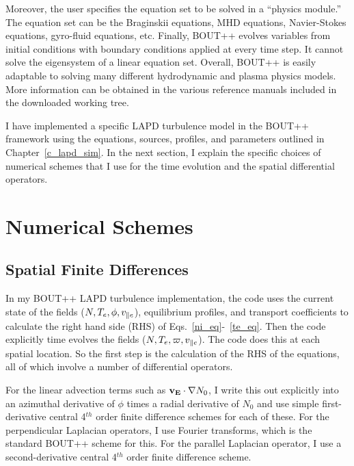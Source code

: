Moreover, the user specifies the equation set to be solved in a ``physics module.'' The equation set can be 
the Braginskii equations, MHD equations, Navier-Stokes equations, gyro-fluid equations, etc.
Finally, BOUT++ evolves variables from initial conditions with boundary conditions applied at every time step. It cannot solve the eigensystem of a linear equation set.
Overall, BOUT++ is easily adaptable to solving many different hydrodynamic and plasma physics models. More information can be obtained in the various reference manuals included in the downloaded
working tree. 

I have implemented a specific LAPD turbulence model in the BOUT++ framework using the equations,
sources, profiles, and parameters outlined in Chapter~\ref{c_lapd_sim}. In the next section, I explain the specific choices of numerical schemes that I use for the time evolution and the spatial
differential operators.

\section{Numerical Schemes}
\label{s_numerical_schemes}

\subsection{Spatial Finite Differences}
\label{ss_sp_finite_dffs}

In my BOUT++ LAPD turbulence implementation, the code uses the current state of the fields ($N, T_e, \phi, v_{\parallel e}$), equilibrium profiles, and transport coefficients to calculate the right hand side (RHS)
of Eqs.~\ref{ni_eq}-~\ref{te_eq}. Then the code explicitly time evolves the fields ($N, T_e, \varpi, v_{\parallel e}$). The code does this at each spatial location.
So the first step is the calculation of the RHS of the equations, all of which involve a number of differential operators.

For the linear advection terms such as ${\bf v_E} \cdot \nabla N_0$, I write this out explicitly into an azimuthal derivative of $\phi$ times a radial derivative of $N_0$ and
use simple first-derivative central 4$^{th}$ order finite difference schemes for each of these. For the perpendicular Laplacian operators, I use
Fourier transforms, which is the standard BOUT++ scheme for this. For the parallel Laplacian operator, I use a second-derivative central 4$^{th}$ order finite difference scheme.

